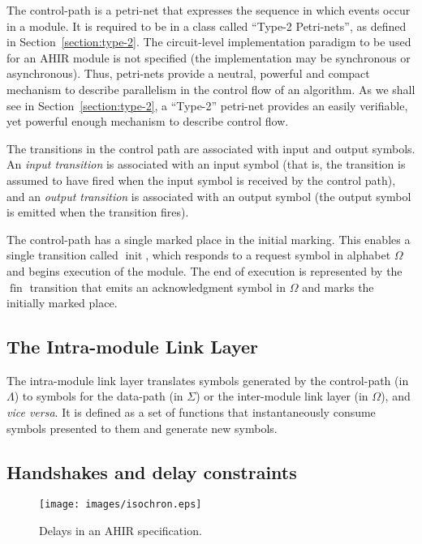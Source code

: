 \documentclass[conference]{IEEEtran}
\newcommand{\sym}[1]{$\operatorname{#1}$}
\begin{document}
The control-path is a petri-net that expresses the sequence in which
events occur in a module. It is required to be in a class called
``Type-2 Petri-nets'', as defined in Section~\ref{section:type-2}.
The circuit-level implementation paradigm to be used for an AHIR module is
not specified (the implementation may be synchronous or asynchronous).
Thus, petri-nets provide a neutral, powerful and compact mechanism to 
describe parallelism in the control flow of an algorithm.  
As we shall see in Section~\ref{section:type-2}, a ``Type-2'' petri-net
provides an easily verifiable, yet powerful enough mechanism to
describe control flow.

The transitions in the control path are associated with input and
output symbols.  An {\em input transition} is associated with
an input symbol (that is, the transition is assumed to have fired
when the input symbol is received by the control path), and an {\em output transition}
is associated with an output symbol (the output symbol is emitted
when the transition fires).

The control-path has a single marked place in the initial marking.
This enables a single transition called \sym{init}, which responds to
a request symbol in alphabet $\Omega$ and begins execution of the
module. The end of execution is represented by the \sym{fin}
transition that emits an acknowledgment symbol in $\Omega$ and marks
the initially marked place.

\subsection{The Intra-module Link Layer}

The intra-module link layer translates symbols generated by the
control-path (in $\Lambda$) to symbols for the data-path (in $\Sigma$)
or the inter-module link layer (in $\Omega$), and \emph{vice versa}.
It is defined as a set of functions that instantaneously consume
symbols presented to them and generate new symbols.

\subsection{Handshakes and delay constraints}
\label{sect:handshakes}

\begin{figure}[!t]
\centering
\texttt{[image: images/isochron.eps]}
\caption{Delays in an AHIR specification.}
\label{fig:isochron}
\end{figure}
\end{document}
